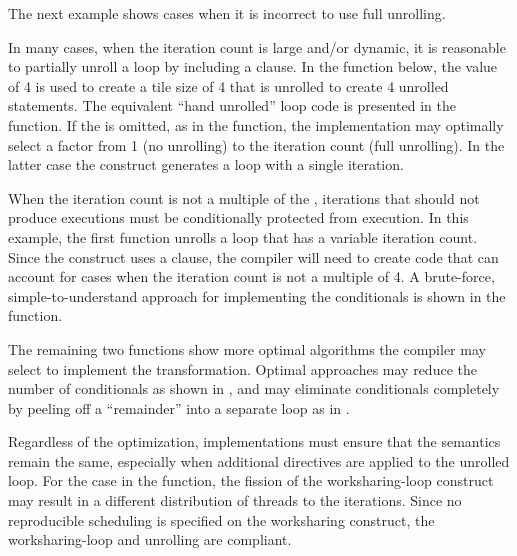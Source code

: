 The next example shows cases when it is incorrect to use full unrolling.


In many cases, when the iteration count is large and/or dynamic, it is
reasonable to partially unroll a loop by including a  clause.
In the  function below, the  value
of 4 is used to create a tile size of 4 that is unrolled to create 4 unrolled statements.
The equivalent ``hand unrolled'' loop code is presented in the 
 function.
If the  is omitted, as in the  
function, the implementation may optimally select a factor from 1 
(no unrolling) to the iteration count (full unrolling).  
In the latter case the construct generates a loop with a single iteration.

\pagebreak
{}

When the iteration count is not a multiple of the ,
iterations that should not produce executions must be conditionally
protected from execution. In this example, the first function
unrolls a loop that has a variable iteration count. Since the 
construct uses a  clause, the compiler will need to
create code that can account for cases when the iteration count is not a
multiple of 4. A brute-force, simple-to-understand approach for implementing 
the conditionals is shown in the  function.

The remaining two functions show more optimal algorithms the compiler 
may select to implement the transformation.
Optimal approaches may reduce the number of conditionals as shown in 
, and 
may eliminate conditionals completely by peeling off a ``remainder'' 
into a separate loop as in . 

Regardless of the optimization, implementations must ensure that the semantics
remain the same, especially when additional directives are applied to
the unrolled loop. For the case in the 
function, the fission of the worksharing-loop construct may result in a different
distribution of threads to the iterations. Since no reproducible scheduling
is specified on the worksharing construct, the worksharing-loop and unrolling are compliant.

